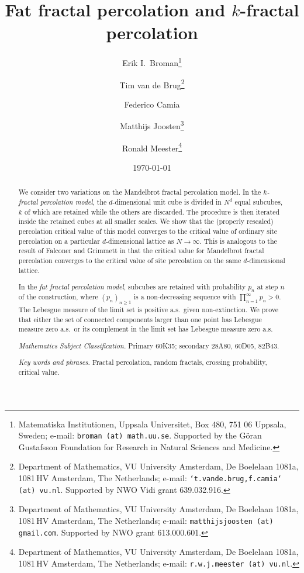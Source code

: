 \documentclass[11pt,a4paper]{article}
\theoremstyle{remark}
\begin{document}
\title{Fat fractal percolation and $k$-fractal percolation}
\author{Erik I.\ Broman\footnote{Matematiska Institutionen, Uppsala Universitet, Box 480, 751 06 Uppsala, Sweden; e-mail: \texttt{broman\,(at)\,math.uu.se}. Supported by the G\"oran Gustafsson Foundation for Research in Natural Sciences and Medicine.}
\and Tim van de Brug\footnote{Department of Mathematics, VU University Amsterdam, De Boelelaan 1081a, 1081\,HV Amsterdam, The Netherlands; e-mail: \texttt{\char`{t.vande.brug,f.camia\char`}\,(at)\,vu.nl}. Supported by NWO Vidi grant 639.032.916.}
\and Federico Camia\footnotemark[2]
\and Matthijs Joosten\footnote{Department of Mathematics, VU University Amsterdam, De Boelelaan 1081a, 1081\,HV Amsterdam, The Netherlands; e-mail: \texttt{matthijsjoosten\,(at)\,gmail.com}. Supported by NWO grant 613.000.601.}
\and Ronald Meester\footnote{Department of Mathematics, VU University Amsterdam, De Boelelaan 1081a, 1081\,HV Amsterdam, The Netherlands; e-mail: \texttt{r.w.j.meester\,(at)\,vu.nl}.}}
\date{\today}


\maketitle





\begin{abstract}
We consider two variations on the Mandelbrot fractal percolation model. In the {\em $k$-fractal percolation model}, the $d$-dimensional unit cube is divided in $N^d$ equal subcubes, $k$ of which are retained while the others are discarded. The procedure is then iterated inside the retained cubes at all smaller scales. We show that the (properly rescaled) percolation critical value of this model converges to the critical value of ordinary site percolation on a particular $d$-dimensional lattice as $N \to \infty$. This is analogous to the result of Falconer and Grimmett in \cite{FalGri} that the critical value for Mandelbrot fractal percolation converges to the critical value of site percolation on the same $d$-dimensional lattice.
 
In the {\em fat fractal percolation model}, subcubes are retained with probability $p_n$ at step $n$ of the construction, where $(p_n)_{n\geq 1}$ is a non-decreasing sequence with $\prod_{n=1}^\infty p_n > 0$. The Lebesgue measure of the limit set is positive a.s.\ given non-extinction. We prove that either the set of connected components larger than one point has Lebesgue measure zero a.s.\ or its complement in the limit set has Lebesgue measure zero a.s.


\medskip
{} {\em Mathematics Subject Classification.} Primary 60K35; secondary 28A80, 60D05, 82B43.


\medskip
\noindent
{\em Key words and phrases.} Fractal percolation, random fractals, crossing probability, critical value.
\end{abstract}
\end{document}
